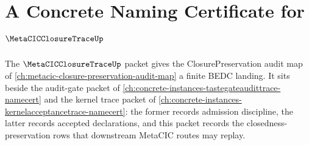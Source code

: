 \chapter{A Concrete Naming Certificate for $\MetaCICClosureTraceUp$}
\label{ch:concrete-instances-metacicclosuretrace-namecert}

The $\MetaCICClosureTraceUp$ packet gives the ClosurePreservation audit map of \autoref{ch:metacic-closure-preservation-audit-map} a finite BEDC landing. It sits beside the audit-gate packet of \autoref{ch:concrete-instances-tastegateaudittrace-namecert} and the kernel trace packet of \autoref{ch:concrete-instances-kernelacceptancetrace-namecert}: the former records admission discipline, the latter records accepted declarations, and this packet records the closedness-preservation rows that downstream MetaCIC routes may replay.

